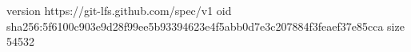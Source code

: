 version https://git-lfs.github.com/spec/v1
oid sha256:5f6100c903e9d28f99ee5b93394623e4f5abb0d7e3c207884f3feaef37e85cca
size 54532

